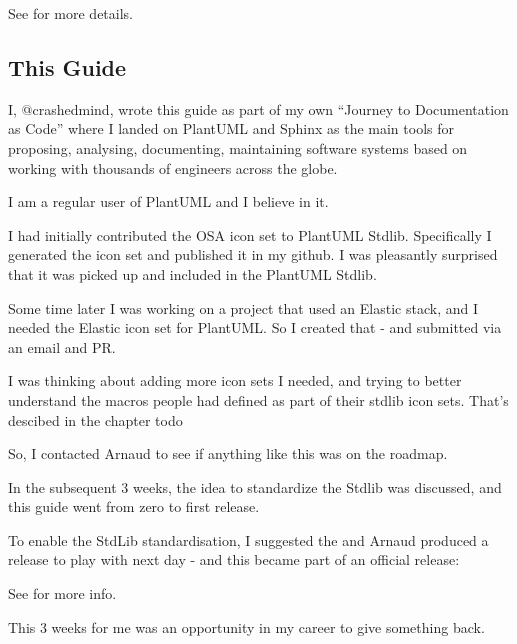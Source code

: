 \documentclass[letterpaper,10pt,english]{sphinxmanual}
\begin{document}
See {\hyperref[\detokenize{DocumentationAsCode/JourneyDocumentationASCode:journeydoc-label}]{}} for more details.


\subsection{This Guide}
\label{\detokenize{about/AboutThisGuide:this-guide}}
I, @crashedmind, wrote this guide as part of my own “Journey to Documentation as Code” where I landed on PlantUML and Sphinx as the main tools for proposing, analysing, documenting, maintaining software systems based on working with thousands of engineers across the globe.

I am a regular user of PlantUML and I believe in it.

I had initially contributed the OSA icon set to PlantUML Stdlib. Specifically I generated the icon set and published it in my github. I was pleasantly surprised that it was picked up and included in the PlantUML Stdlib.

Some time later I was working on a project that used an Elastic stack, and I needed the Elastic icon set for PlantUML. So I created that - and submitted via an email and PR.

I was thinking about adding more icon sets I needed, and trying to better understand the macros people had defined as part of their stdlib icon sets.
That’s descibed in the chapter todo

So, I contacted Arnaud to see if anything like this was on the roadmap.

In the subsequent 3 weeks, the idea to standardize the Stdlib was discussed, and this guide went from zero to first release.

To enable the StdLib standardisation, I suggested the  and Arnaud produced a release to play with next day - and this became part of an official release:


See {\hyperref[\detokenize{StdlibUnderTheHood/StdlibUnderstanding:understandingstdlib-label}]{}} for more info.

This 3 weeks for me was an opportunity in my career to give something back.
\end{document}
